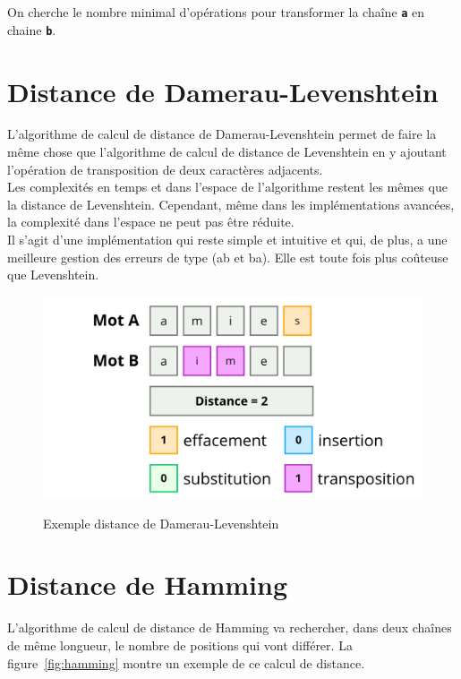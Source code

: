 \documentclass[a4paper, 11pt]{report}
\newcommand{\var}[1]{\texttt{\textbf{#1}}}
\begin{document}
\vspace{\baselineskip}
\noindent{}On cherche le nombre minimal d'opérations pour transformer la chaîne \var{a} en chaine \var{b}.

\section{Distance de Damerau-Levenshtein}

L'algorithme de calcul de distance de Damerau-Levenshtein permet de faire la même chose que l'algorithme de calcul de distance de Levenshtein en y ajoutant l'opération de transposition de deux caractères adjacents.  \\

Les complexités en temps et dans l'espace de l'algorithme restent les mêmes que la distance de Levenshtein. Cependant, même dans les implémentations avancées, la complexité dans l'espace ne peut pas être réduite. \\

Il s'agit d'une implémentation qui reste simple et intuitive et qui, de plus, a une meilleure gestion des erreurs de type (\og{}ab\fg{} et \og{}ba\fg{}). Elle est toute fois plus coûteuse que Levenshtein.

\begin{figure}[H]
	\begin{center}
		{\includegraphics[height=0.45\textwidth]{images/damerau-levenshtein.png}}
	\end{center}
	\caption{Exemple distance de Damerau-Levenshtein}
	\label{fig:damerau}
\end{figure}
\section{Distance de Hamming}

L'algorithme de calcul de distance de Hamming va rechercher, dans deux chaînes de même longueur, le nombre de positions qui vont différer. La figure~\ref{fig:hamming} montre un exemple de ce calcul de distance.\\
\end{document}
